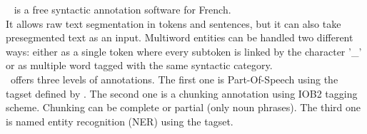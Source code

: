 \documentclass[manual-fr.tex]{subfiles}
\begin{document}
\SEMFull\ \cite{Tellier_demo2012} is a free syntactic annotation software for French.\\

It allows raw text segmentation in tokens and sentences, but it can also take presegmented text as an input. Multiword entities can be handled two different ways: either as a single token where every subtoken is linked by the character '\_' or as multiple word tagged with the same syntactic category.\\

\SEM\ offers three levels of annotations. The first one is Part-Of-Speech using the tagset defined by \cite{Crabbe08}. The second one is a chunking annotation using IOB2 tagging scheme. Chunking can be complete or partial (only noun phrases). The third one is named entity recognition (NER) using the \cite{sagot2012annotation} tagset.\\
\end{document}
